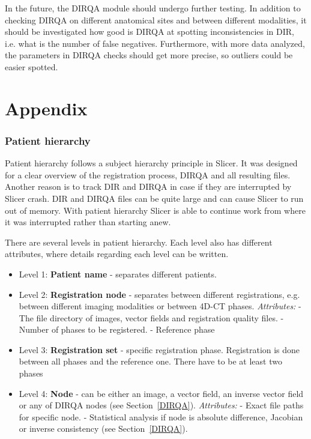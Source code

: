 In the future, the DIRQA module should undergo further testing. In addition to checking DIRQA on different anatomical sites and between different modalities, 
it should be investigated how good is DIRQA at spotting inconsistencies in DIR, i.e. what is the number of false negatives. Furthermore, with more
data analyzed, the parameters in DIRQA checks should get more precise, so outliers could be easier spotted.

\newpage


\section{Appendix}
\label{RegHierarchy}
% 

\subsubsection{Patient hierarchy} 
\label{PatHierarchy}

Patient hierarchy follows a subject hierarchy principle in Slicer. It was designed for a clear overview of the registration process, DIRQA and all resulting files. Another reason is to track DIR
and DIRQA in case if they are interrupted by Slicer crash. DIR and DIRQA files can be quite large and can cause Slicer to run out of memory. With patient hierarchy Slicer is able to continue work
from where it was interrupted rather than starting anew.

There are several levels in patient hierarchy. Each level also has different attributes, where details regarding each level can be written.

\begin{itemize}
	\item Level 1: \textbf{Patient name} - separates different patients.
	\item Level 2: \textbf{Registration node} - separates between different registrations, e.g. between different imaging modalities or between 4D-CT phases. 
	\subitem \textit{Attributes:}
	\subitem - The file directory of images, vector fields and registration quality files.
	\subitem - Number of phases to be registered.
	\subitem - Reference phase
	\item Level 3: \textbf{Registration set} - specific registration phase. Registration is done between all phases and the reference one. There have to be at least two phases
	\item Level 4: \textbf{Node} - can be either an image, a vector field, an inverse vector field or any of DIRQA nodes (see Section~\ref{DIRQA}).
	\subitem \textit{Attributes:}
	\subitem - Exact file paths for specific node.
	\subitem - Statistical analysis if node is absolute difference, Jacobian or inverse consistency (see Section~\ref{DIRQA}).
\end{itemize}

